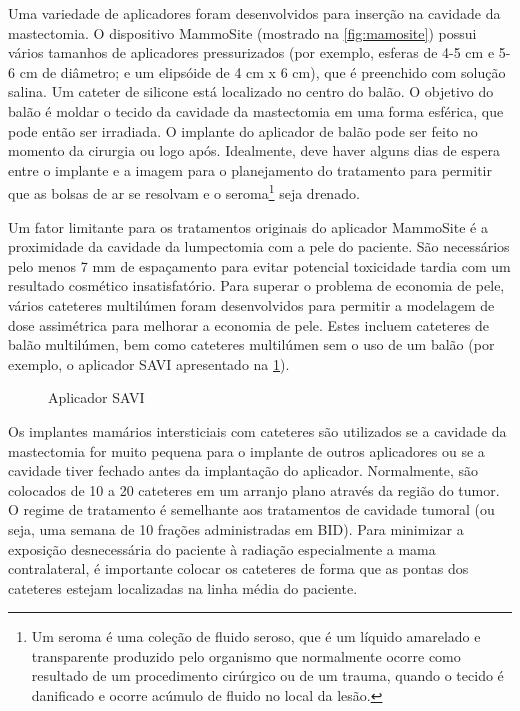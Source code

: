 \documentclass[11pt,a4paper]{article}
\newcounter{exemplo}
\begin{document}
	Uma variedade de aplicadores foram desenvolvidos para inserção na cavidade da mastectomia. O dispositivo MammoSite (mostrado na \ref{fig:mamosite}) possui vários tamanhos de aplicadores  pressurizados (por exemplo, esferas de 4-5 cm e 5-6 cm de diâmetro; e um elipsóide de 4 cm x 6 cm), que é preenchido com solução salina. Um cateter de silicone está localizado no centro do balão. O objetivo do balão é moldar o tecido da cavidade da mastectomia em uma forma esférica, que pode então ser irradiada. O implante do aplicador de balão pode ser feito no momento da cirurgia ou logo após. Idealmente, deve haver alguns dias de espera entre o implante e a imagem para o planejamento do tratamento para permitir que as bolsas de ar se resolvam e o seroma\footnote{Um seroma é uma coleção de fluido seroso, que é um líquido amarelado e transparente produzido pelo organismo que normalmente ocorre como resultado de um procedimento cirúrgico ou de um trauma, quando o tecido é danificado e ocorre acúmulo de fluido no local da lesão. } seja drenado.

	Um fator limitante para os tratamentos originais do aplicador MammoSite é a proximidade da cavidade da lumpectomia com a pele do paciente. São necessários pelo menos 7 mm de espaçamento para evitar potencial toxicidade tardia com um resultado cosmético insatisfatório. Para superar o problema de economia de pele, vários cateteres multilúmen foram desenvolvidos para permitir a modelagem de dose assimétrica para melhorar a economia de pele. Estes incluem cateteres de balão multilúmen, bem como cateteres multilúmen sem o uso de um balão (por exemplo, o aplicador SAVI apresentado na \ref{fig:savi}).

	\begin{figure}
		\centering
		\caption{Aplicador SAVI}
		\label{fig:savi}
	\end{figure}

	Os implantes mamários intersticiais com cateteres são utilizados se a cavidade da mastectomia for muito pequena para o implante de outros aplicadores ou se a cavidade tiver fechado antes da implantação do aplicador. Normalmente, são colocados de 10 a 20 cateteres em um arranjo plano através da região do tumor. O regime de tratamento é semelhante aos tratamentos de cavidade tumoral (ou seja, uma semana de 10 frações administradas em BID). Para minimizar a exposição desnecessária do paciente à radiação especialmente a mama contralateral, é importante colocar os cateteres de forma que as pontas dos cateteres estejam localizadas na linha média do paciente.
\end{document}
